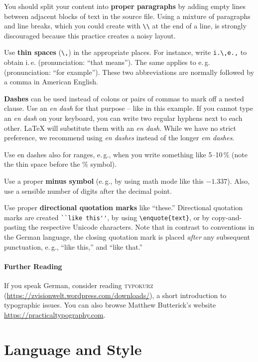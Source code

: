 You should split your content into \textbf{proper paragraphs} by adding empty lines between adjacent blocks of text in the source file. Using a mixture of paragraphs and line breaks, which you could create with \verb|\\| at the end of a line, is strongly discouraged because this practice creates a noisy layout.

Use \textbf{thin spaces} (\verb|\,|) in the appropriate places. For instance, write \verb|i.\,e.,| to obtain i.\,e. (pronunciation: ``that means''). The same applies to e.\,g. (pronunciation: ``for example''). These two abbreviations are normally followed by a comma in American English.

\textbf{Dashes} can be used instead of colons or pairs of commas to mark off a nested clause. Use an \emph{en dash} for that purpose -- like in this example. If you cannot type an \emph{en dash} on your keyboard, you can write two regular hyphens next to each other. LaTeX will substitute them with an \emph{en dash}. While we have no strict preference, we recommend using \emph{en dashes} instead of the longer \emph{em dashes}.

Use en dashes also for ranges, e.\,g., when you write something like 5--10\,\% (note the thin space before the \% symbol).

Use a proper \textbf{minus symbol} (e.\,g., by using math mode like this \(-1.337\)). Also, use a sensible number of digits after the decimal point.

Use proper \textbf{directional quotation marks} like ``these.'' Directional quotation marks are created  \verb|``like this''|, by using \verb|\enquote{text}|, or by copy-and-pasting the respective Unicode characters. Note that in contrast to conventions in the German language, the closing quotation mark is placed \emph{after} any subsequent punctuation, e.\,g., ``like this,'' and ``like that.''

\paragraph{Further Reading}

If you speak German, consider reading \textsc{typokurz} (\url{https://zvisionwelt.wordpress.com/downloads/}), a short introduction to typographic issues. You can also browse Matthew Butterick's website \url{https://practicaltypography.com}.

\section{Language and Style}

